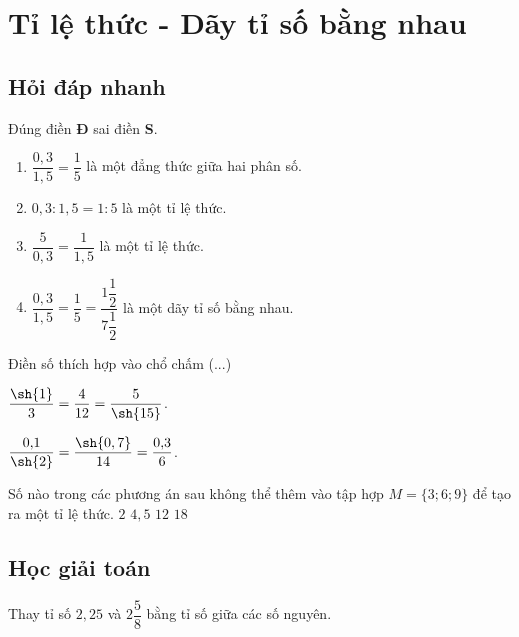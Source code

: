 \section{Tỉ lệ thức - Dãy tỉ số bằng nhau}
\subsection{Hỏi đáp nhanh}

\begin{ex}
	Đúng điền \textbf{Đ} sai điền \textbf{S}.
	\begin{enumerate}
		\item {} $\dfrac{0{,}3}{1{,}5}=\dfrac{1}{5}$ là một đẳng thức giữa hai phân số.
		\item {} $0{,3}:1{,}5=1:5$ là một tỉ lệ thức.
		\item {} $\dfrac{5}{0{,}3}=\dfrac{1}{1{,}5}$ là một tỉ lệ thức.
		\item {} $\dfrac{0{,}3}{1{,}5}=\dfrac{1}{5}=\dfrac{1\dfrac{1}{2}}{7\dfrac{1}{2}}$ là một dãy tỉ số bằng nhau.
	\end{enumerate}
\end{ex}

\begin{ex}
	Điền số thích hợp vào chổ chấm (...)
	\begin{enumEX}{2}
		\item $\dfrac{\sh{1}}{3}=\dfrac{4}{12}=\dfrac{5}{\sh{15}}$.
		\item $\dfrac{0{,}1}{\sh{2}}=\dfrac{\sh{0{,7}}}{14}=\dfrac{0{,}3}{6}$.
	\end{enumEX}
\end{ex}

\begin{ex}
Số nào trong các phương án sau không thể thêm vào tập hợp $M=\{3;6;9\}$ để tạo ra một tỉ lệ thức.
\choice
{$ 2 $}
{$ 4{,}5 $}
{\True $ 12 $}
{$ 18 $}
\loigiai{

}
\end{ex}

\subsection{Học giải toán}

\begin{vd}%
	Thay tỉ số $2{,}25$ và $2\dfrac{5}{8}$ bằng tỉ số giữa các số nguyên.
\end{vd}

